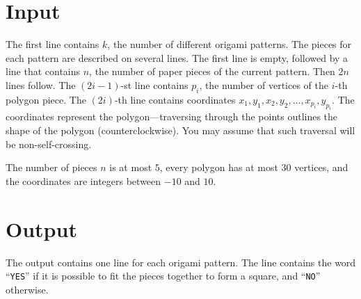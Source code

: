 \section*{Input}

The first line contains $k$, the number of different origami
patterns. The pieces for each pattern are described on several
lines. The first line is empty, followed by a line that contains $n$,
the number of paper pieces of the current pattern. Then $2n$ lines
follow. The $(2i - 1)$-st line contains $p_i$, the number of vertices
of the $i$-th polygon piece. The $(2i)$-th line contains coordinates
$x_1, y_1, x_2, y_2, \ldots ,x_{p_i}, y_{p_i}$. The coordinates
represent the polygon---traversing through the points outlines the
shape of the polygon (counterclockwise). You may assume that such
traversal will be non-self-crossing.

The number of pieces $n$ is at most $5$, every polygon has at most
$30$ vertices, and the coordinates are integers between $-10$ and
$10$.

\section*{Output}

The output contains one line for each origami pattern. The line
contains the word ``\verb+YES+'' if it is possible to fit the pieces
together to form a square, and ``\verb+NO+'' otherwise.
